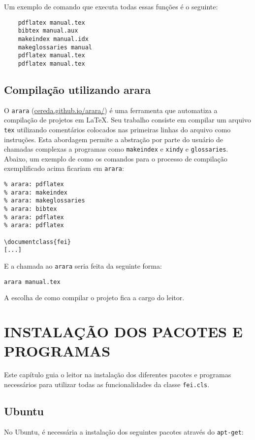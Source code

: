 \documentclass{fei}
\begin{document}
	Um exemplo de comando que executa todas essas funções é o seguinte:
	
	\begin{verbatim}
	pdflatex manual.tex
	bibtex manual.aux
	makeindex manual.idx
	makeglossaries manual
	pdflatex manual.tex
	pdflatex manual.tex
	\end{verbatim}
	
	\section{Compilação utilizando arara}
	
	O \texttt{arara} (\url{cereda.github.io/arara/}) é uma ferramenta que automatiza a compilação de projetos em \LaTeX. Seu trabalho consiste em compilar um arquivo \texttt{tex} utilizando comentários colocados nas primeiras linhas do arquivo como instruções. Esta abordagem permite a abstração por parte do usuário de chamadas complexas a programas como \texttt{makeindex} e \texttt{xindy} e \texttt{glossaries}. Abaixo, um exemplo de como os comandos para o processo de compilação exemplificado acima ficariam em \texttt{arara}:
	
	\begin{verbatim}
% arara: pdflatex
% arara: makeindex
% arara: makeglossaries
% arara: bibtex
% arara: pdflatex
% arara: pdflatex

\documentclass{fei}
[...]
	\end{verbatim}
	
	E a chamada ao \texttt{arara} seria feita da seguinte forma:
	
	\texttt{arara manual.tex}
	
	A escolha de como compilar o projeto fica a cargo do leitor.	
	
	\chapter{INSTALAÇÃO DOS PACOTES E PROGRAMAS}	\label{chap:instalacao}
	
	Este capítulo guia o leitor na instalação dos diferentes pacotes e programas necessários para utilizar todas as funcionalidades da classe \texttt{fei.cls}.
	
	\section{Ubuntu}
	
	No Ubuntu, é necessária a instalação dos seguintes pacotes através do \texttt{apt-get}:
	
\end{document}
